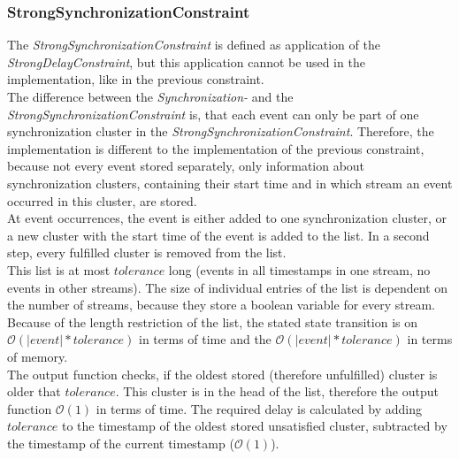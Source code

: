 \subsubsection{StrongSynchronizationConstraint}
	The \emph{StrongSynchronizationConstraint} is defined as application of the \emph{StrongDelayConstraint}, but this application cannot be used in the implementation, like in the previous constraint.\\
	The difference between the \emph{Synchronization-} and the \emph{StrongSynchronizationConstraint} is, that each event can only be part of one synchronization cluster in the \emph{StrongSynchronizationConstraint}. Therefore, the implementation is different to the implementation of the previous constraint, because not every event stored separately, only information about synchronization clusters, containing their start time and in which stream an event occurred in this cluster, are stored.\\
	At event occurrences, the event is either added to one synchronization cluster, or a new cluster with the start time of the event is added to the list. In a second step, every fulfilled cluster is removed from the list.\\
	This list is at most $tolerance$ long (events in all timestamps in one stream, no events in other streams). The size of individual entries of the list is dependent on the number of streams, because they store a boolean variable for every stream. Because of the length restriction of the list, the stated state transition is on $\mathcal{O}(|event|*tolerance)$ in terms of time and the $\mathcal{O}(|event|*tolerance)$ in terms of memory.\\
	The output function checks, if the oldest stored (therefore unfulfilled) cluster is older that $tolerance$. This cluster is in the head of the list, therefore the output function $\mathcal{O}(1)$ in terms of time. The required delay is calculated by adding $tolerance$ to the timestamp of the oldest stored unsatisfied cluster, subtracted by the timestamp of the current timestamp ($\mathcal{O}(1)$). 
	
